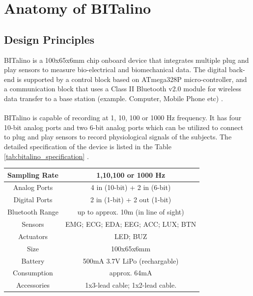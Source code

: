 \section{Anatomy of BITalino}
\subsection{Design Principles}
\label{design_principles}
BITalino is a 100x65x6mm chip onboard device that integrates multiple plug and play sensors to measure bio-electrical and biomechanical data. The digital back-end is supported by a control block based on ATmega328P micro-controller, and a communication block that uses a Class II Bluetooth v2.0 module for wireless data transfer to a base station (example. Computer, Mobile Phone etc) \cite{silva_bitalino:_2014}.

\paragraph{} BITalino is capable of recording at 1, 10, 100 or 1000 Hz frequency. It has four 10-bit analog ports and two 6-bit analog ports which can be utilized to connect to plug and play sensors to record physiological signals of the subjects. The detailed specification of the device is listed in the Table \ref{tab:bitalino_specification} \cite{bitalino_datasheet}.

\begin{center}
\begin{tabular}{ |c|c| }
\hline
Sampling Rate & 1,10,100 or 1000 Hz \\
\hline
Analog Ports & 4 in (10-bit) + 2 in (6-bit) \\
\hline
Digital Ports & 2 in (1-bit) + 2 out (1-bit) \\
\hline
Bluetooth Range & up to approx. 10m (in line of sight) \\
\hline
Sensors & EMG; ECG; EDA; EEG; ACC; LUX; BTN \\
\hline
Actuators & LED; BUZ \\
\hline
Size & 100x65x6mm \\
\hline
Battery & 500mA 3.7V LiPo (rechargable) \\
\hline
Consumption & approx. 64mA \\
\hline
Accessories & 1x3-lead cable; 1x2-lead cable. \\
\hline
\end{tabular}
\label{tab:bitalino_specification}
\end{center}

